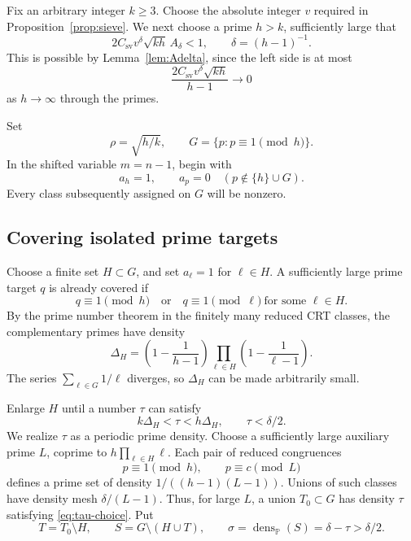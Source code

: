 \documentclass[10pt]{amsart}
\numberwithin{equation}{section}
\newcommand{\PP}{\mathbb P}
\newcommand{\dens}{\operatorname{dens}}
\theoremstyle{remark}
\begin{document}
Fix an arbitrary integer \(k\ge3\). Choose the absolute integer \(v\)
required in Proposition~\ref{prop:sieve}. We next choose a prime \(h>k\),
sufficiently large that
\begin{equation}\label{eq:h-choice}
 2C_{\mathrm{sv}}v^\delta\sqrt{kh}\,A_\delta<1,
 \qquad
 \delta=(h-1)^{-1}.
\end{equation}
This is possible by Lemma~\ref{lem:Adelta}, since the left side is at most
\[
 \frac{2C_{\mathrm{sv}}v^\delta\sqrt{kh}}{h-1}\longrightarrow0
\]
as \(h\to\infty\) through the primes.

Set
\[
 \rho=\sqrt{h/k},
 \qquad
 G=\{p:p\equiv1\pmod h\}.
\]
In the shifted variable \(m=n-1\), begin with
\begin{equation}\label{eq:initial-classes}
 a_h=1,\qquad a_p=0\quad(p\notin\{h\}\cup G).
\end{equation}
Every class subsequently assigned on \(G\) will be nonzero.

\subsection{Covering isolated prime targets}

Choose a finite set \(H\subset G\), and set \(a_\ell=1\) for \(\ell\in H\).
A sufficiently large prime target \(q\) is already covered if
\[
 q\equiv1\pmod h
 \quad\text{or}\quad
 q\equiv1\pmod\ell\ \text{for some }\ell\in H.
\]
By the prime number theorem in the finitely many reduced CRT classes, the
complementary primes have density
\begin{equation}\label{eq:DeltaH}
 \Delta_H=
 \left(1-\frac1{h-1}\right)
 \prod_{\ell\in H}\left(1-\frac1{\ell-1}\right).
\end{equation}
The series \(\sum_{\ell\in G}1/\ell\) diverges, so \(\Delta_H\) can be made
arbitrarily small.

Enlarge \(H\) until a number \(\tau\) can satisfy
\begin{equation}\label{eq:tau-choice}
 k\Delta_H<\tau<h\Delta_H,
 \qquad
 \tau<\delta/2.
\end{equation}
We realize \(\tau\) as a periodic prime density. Choose a sufficiently large
auxiliary prime \(L\), coprime to \(h\prod_{\ell\in H}\ell\). Each pair of
reduced congruences
\[
 p\equiv1\pmod h,
 \qquad
 p\equiv c\pmod L
\]
defines a prime set of density \(1/((h-1)(L-1))\). Unions of such classes
have density mesh \(\delta/(L-1)\). Thus, for large \(L\), a union
\(T_0\subset G\) has density \(\tau\) satisfying \eqref{eq:tau-choice}. Put
\begin{equation}\label{eq:pools}
 T=T_0\setminus H,\qquad
 S=G\setminus(H\cup T),\qquad
 \sigma=\dens_{\PP}(S)=\delta-\tau>\delta/2.
\end{equation}
\end{document}
